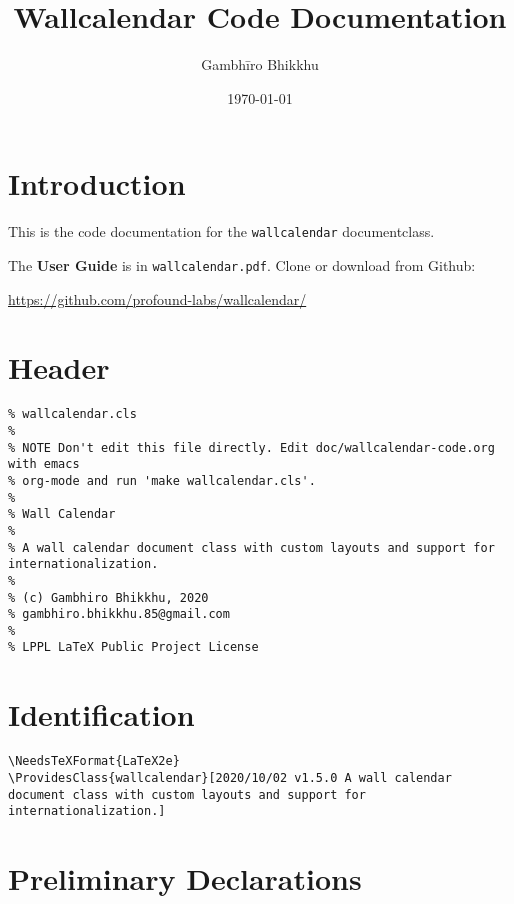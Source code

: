 \documentclass[11pt,oneside]{memoir-article}
\author{Gambhīro Bhikkhu}
\date{\today}
\title{Wallcalendar Code Documentation}
\begin{document}
\maketitle

\chapter{Introduction}
\label{sec:orgeb2dca0}

\bigskip

This is the code documentation for the \texttt{wallcalendar} documentclass.

The \textbf{User Guide} is in \texttt{wallcalendar.pdf}. Clone or download from Github:

\href{https://github.com/profound-labs/wallcalendar/}{https://github.com/profound-labs/wallcalendar/}

\bigskip

\tableofcontents*

\clearpage

\chapter{Header}
\label{sec:org40837a7}

\begin{verbatim}
% wallcalendar.cls
%
% NOTE Don't edit this file directly. Edit doc/wallcalendar-code.org with emacs
% org-mode and run 'make wallcalendar.cls'.
%
% Wall Calendar
%
% A wall calendar document class with custom layouts and support for internationalization.
%
% (c) Gambhiro Bhikkhu, 2020
% gambhiro.bhikkhu.85@gmail.com
%
% LPPL LaTeX Public Project License
\end{verbatim}

\chapter{Identification}
\label{sec:org77b24b1}

\begin{verbatim}
\NeedsTeXFormat{LaTeX2e}
\ProvidesClass{wallcalendar}[2020/10/02 v1.5.0 A wall calendar document class with custom layouts and support for internationalization.]
\end{verbatim}

\chapter{Preliminary Declarations}
\label{sec:org664a2a7}
\end{document}
